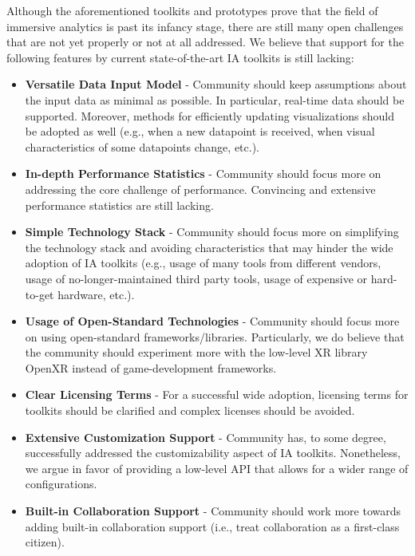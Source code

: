 \documentclass{vgtc}                          %
\begin{document}
\noindent Although the aforementioned toolkits and prototypes prove that the
field of immersive analytics is past its infancy stage, there are still many
open challenges that are not yet properly or not at all addressed. We believe
that support for the following features by current state-of-the-art IA toolkits
is still lacking:

\begin{itemize}
	\item \textbf{Versatile Data Input Model} - Community should keep
	      assumptions about the input data as minimal as possible. In
	      particular, real-time data should be supported. Moreover, methods for
	      efficiently updating visualizations should be adopted as well (e.g.,
	      when a new datapoint is received, when visual characteristics of some
	      datapoints change, etc.).
	\item \textbf{In-depth Performance Statistics} - Community should focus
	      more on addressing the core challenge of performance. Convincing and extensive
	      performance statistics are still lacking.
	\item \textbf{Simple Technology Stack} - Community should focus more on
	      simplifying the technology stack and avoiding characteristics that
	      may hinder the wide adoption of IA toolkits (e.g., usage of many
	      tools from different vendors, usage of no-longer-maintained third
	      party tools, usage of expensive or hard-to-get hardware, etc.).
	\item \textbf{Usage of Open-Standard Technologies} - Community should focus more on
	      using open-standard frameworks/libraries. Particularly, we do believe 
	      that the community should experiment more with the low-level XR library
	      OpenXR instead of game-development frameworks.
	\item \textbf{Clear Licensing Terms} - For a successful wide adoption,
	      licensing terms for toolkits should be clarified and complex licenses
	      should be avoided.
	\item \textbf{Extensive Customization Support} - Community has, to some degree,
	      successfully addressed the customizability aspect of IA toolkits.
	      Nonetheless, we argue in favor of providing a low-level API that
	      allows for a wider range of configurations.
	\item \textbf{Built-in Collaboration Support} - Community should work more towards
	      adding built-in collaboration support (i.e., treat collaboration as a first-class citizen).

\end{itemize}
\end{document}
